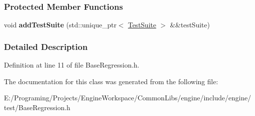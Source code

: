\subsubsection*{Protected Member Functions}
\begin{DoxyCompactItemize}
\item 
void {\bfseries add\+Test\+Suite} (std\+::unique\+\_\+ptr$<$ \hyperlink{a00077}{Test\+Suite} $>$ \&\&test\+Suite)\hypertarget{a00006_a06d2d89b7427837020675fef014d5545}{}\label{a00006_a06d2d89b7427837020675fef014d5545}

\end{DoxyCompactItemize}


\subsubsection{Detailed Description}


Definition at line 11 of file Base\+Regression.\+h.



The documentation for this class was generated from the following file\+:\begin{DoxyCompactItemize}
\item 
E\+:/\+Programing/\+Projects/\+Engine\+Workspace/\+Common\+Libs/engine/include/engine/test/Base\+Regression.\+h\end{DoxyCompactItemize}
